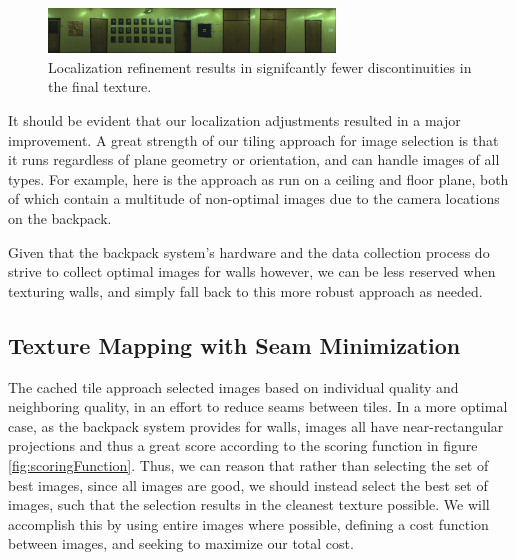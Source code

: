 \documentclass[10pt,twocolumn,letterpaper]{article}
\begin{document}
\begin{figure}
  \centering
  \includegraphics[width=3in]{wall1_cache_full_shifted.jpg}
  \caption{Localization refinement results in signifcantly fewer
    discontinuities in the final texture.}
  \label{fig:shifted}
\end{figure}


It should be evident that our localization adjustments resulted in a
major improvement. A great strength of our tiling approach for image
selection is that it runs regardless of plane geometry or orientation,
and can handle images of all types. For example, here is the approach
as run on a ceiling and floor plane, both of which contain a multitude
of non-optimal images due to the camera locations on the backpack.


Given that the backpack system's hardware and the data collection
process do strive to collect optimal images for walls however, we can
be less reserved when texturing walls, and simply fall back to this
more robust approach as needed.

\subsection{Texture Mapping with Seam Minimization}
The cached tile approach selected images based on individual quality
and neighboring quality, in an effort to reduce seams between
tiles. In a more optimal case, as the backpack system provides for
walls, images all have near-rectangular projections and thus a great
score according to the scoring function in figure
\ref{fig:scoringFunction}. Thus, we can reason that rather than
selecting the set of best images, since all images are good, we should
instead select the best set of images, such that the selection results
in the cleanest texture possible. We will accomplish this by using
entire images where possible, defining a cost function between images,
and seeking to maximize our total cost.
\end{document}
